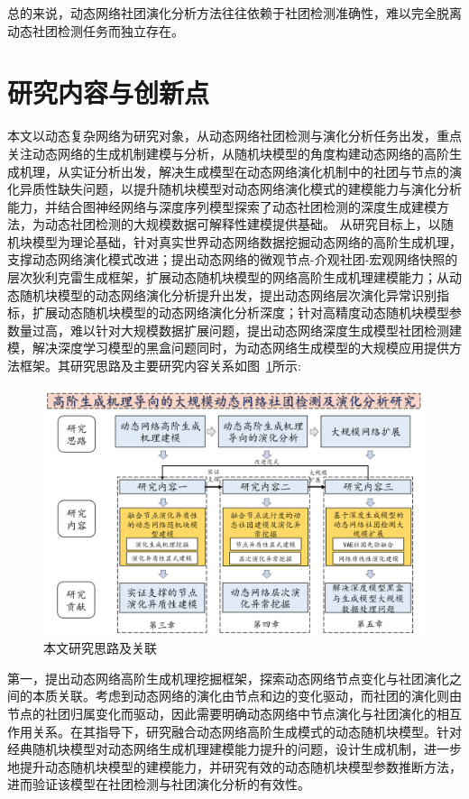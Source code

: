 总的来说，动态网络社团演化分析方法往往依赖于社团检测准确性，难以完全脱离动态社团检测任务而独立存在。

\section{研究内容与创新点}

本文以动态复杂网络为研究对象，从动态网络社团检测与演化分析任务出发，重点关注动态网络的生成机制建模与分析，从随机块模型的角度构建动态网络的高阶生成机理，从实证分析出发，解决生成模型在动态网络演化机制中的社团与节点的演化异质性缺失问题，以提升随机块模型对动态网络演化模式的建模能力与演化分析能力，并结合图神经网络与深度序列模型探索了动态社团检测的深度生成建模方法，为动态社团检测的大规模数据可解释性建模提供基础。
从研究目标上，以随机块模型为理论基础，针对真实世界动态网络数据挖掘动态网络的高阶生成机理，支撑动态网络演化模式改进；提出动态网络的微观节点-介观社团-宏观网络快照的层次狄利克雷生成框架，扩展动态随机块模型的网络高阶生成机理建模能力；从动态随机块模型的动态网络演化分析提升出发，提出动态网络层次演化异常识别指标，扩展动态随机块模型的动态网络演化分析深度；针对高精度动态随机块模型参数量过高，难以针对大规模数据扩展问题，提出动态网络深度生成模型社团检测建模，解决深度学习模型的黑盒问题同时，为动态网络生成模型的大规模应用提供方法框架。其研究思路及主要研究内容关系如图~\ref{chap1:fig:framework}所示:
\begin{figure}
    \centering
    \includegraphics[width=.75\linewidth]{figures/chap01/framework.png}
    \caption{本文研究思路及关联}
    \label{chap1:fig:framework}
\end{figure}

第一，提出动态网络高阶生成机理挖掘框架，探索动态网络节点变化与社团演化之间的本质关联。考虑到动态网络的演化由节点和边的变化驱动，而社团的演化则由节点的社团归属变化而驱动，因此需要明确动态网络中节点演化与社团演化的相互作用关系。在其指导下，研究融合动态网络高阶生成模式的动态随机块模型。针对经典随机块模型对动态网络生成机理建模能力提升的问题，设计生成机制，进一步地提升动态随机块模型的建模能力，并研究有效的动态随机块模型参数推断方法，进而验证该模型在社团检测与社团演化分析的有效性。

